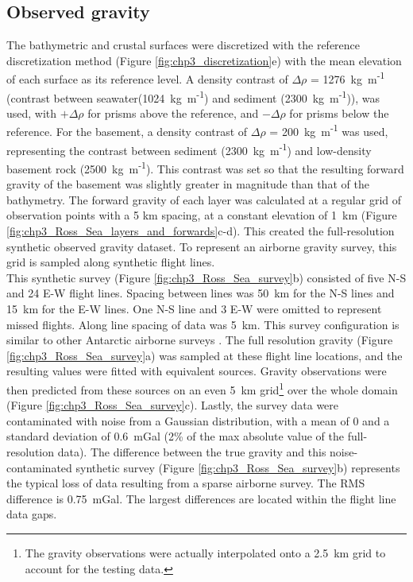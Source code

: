 \subsection{Observed gravity}

The bathymetric and crustal surfaces were discretized with the reference discretization method (Figure \ref{fig:chp3_discretization}e) with the mean elevation of each surface as its reference level. A density contrast of $\Delta\rho$ = 1276~kg~m\textsuperscript{-1} (contrast between seawater(1024~kg~m\textsuperscript{-1}) and sediment (2300~kg~m\textsuperscript{-1})), was used, with $+\Delta\rho$ for prisms above the reference, and $-\Delta\rho$ for prisms below the reference. For the basement, a density contrast of $\Delta\rho$ = 200~kg~m\textsuperscript{-1} was used, representing the contrast between sediment (2300~kg~m\textsuperscript{-1}) and low-density basement rock (2500~kg~m\textsuperscript{-1}). This contrast was set so that the resulting forward gravity of the basement was slightly greater in magnitude than that of the bathymetry. The forward gravity of each layer was calculated at a regular grid of observation points with a 5 km spacing, at a constant elevation of 1~km (Figure \ref{fig:chp3_Ross_Sea_layers_and_forwards}c-d). This created the full-resolution synthetic observed gravity dataset. To represent an airborne gravity survey, this grid is sampled along synthetic flight lines. \\

This synthetic survey (Figure \ref{fig:chp3_Ross_Sea_survey}b) consisted of five N-S and 24 E-W flight lines. Spacing between lines was 50~km for the N-S lines and 15~km for the E-W lines. One N-S line and 3 E-W were omitted to represent missed flights. Along line spacing of data was 5~km. This survey configuration is similar to other Antarctic airborne surveys \citep{tintoross2019}. The full resolution gravity (Figure \ref{fig:chp3_Ross_Sea_survey}a) was sampled at these flight line locations, and the resulting values were fitted with equivalent sources. Gravity observations were then predicted from these sources on an even 5~km grid\footnote{The gravity observations were actually interpolated onto a 2.5~km grid to account for the testing data.} over the whole domain (Figure \ref{fig:chp3_Ross_Sea_survey}c). Lastly, the survey data were contaminated with noise from a Gaussian distribution, with a mean of 0 and a standard deviation of 0.6~mGal (2\% of the max absolute value of the full-resolution data). The difference between the true gravity and this noise-contaminated synthetic survey (Figure \ref{fig:chp3_Ross_Sea_survey}b) represents the typical loss of data resulting from a sparse airborne survey. The RMS difference is 0.75~mGal. The largest differences are located within the flight line data gaps. \\

